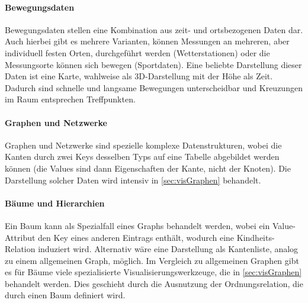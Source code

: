 				\paragraph{Bewegungsdaten}
					Bewegungsdaten stellen eine Kombination aus zeit- und ortsbezogenen Daten dar. Auch hierbei gibt es mehrere Varianten, \bspw können Messungen an mehreren, aber individuell festen Orten, durchgeführt werden (\zB Wetterstationen) oder die Messungsorte können sich bewegen (\zB Sportdaten). Eine beliebte Darstellung dieser Daten ist eine Karte, wahlweise als 3D-Darstellung mit der Höhe als Zeit. Dadurch sind schnelle und langsame Bewegungen unterscheidbar und Kreuzungen im Raum entsprechen Treffpunkten.

				\paragraph{Graphen und Netzwerke}
					Graphen und Netzwerke sind spezielle komplexe Datenstrukturen, wobei die Kanten durch zwei Keys desselben Typs auf eine Tabelle abgebildet werden können (die Values sind dann Eigenschaften der Kante, nicht der Knoten). Die Darstellung solcher Daten wird intensiv in \autoref{sec:visGraphen} behandelt.

				\paragraph{Bäume und Hierarchien}
					Ein Baum kann als Spezialfall eines Graphs behandelt werden, wobei ein Value-Attribut den Key eines anderen Eintrags enthält, wodurch eine Kindheits-Relation induziert wird. Alternativ wäre eine Darstellung als Kantenliste, analog zu einem allgemeinen Graph, möglich. Im Vergleich zu allgemeinen Graphen gibt es für Bäume viele spezialisierte Visualisierungswerkzeuge, die in \autoref{sec:visGraphen} behandelt werden. Dies geschieht durch die Ausnutzung der Ordnungsrelation, die durch einen Baum definiert wird.

